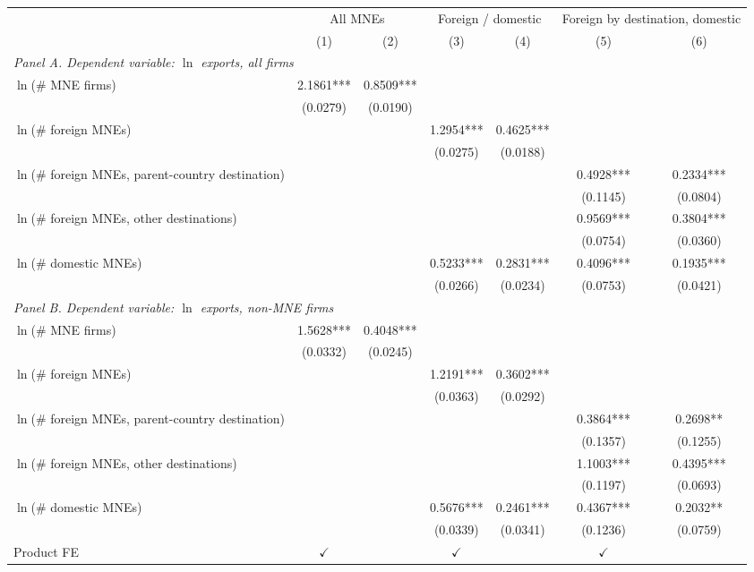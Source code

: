 \begin{tabular}{lcccccc} \hline
 & \multicolumn{2}{c}{All MNEs} & \multicolumn{2}{c}{Foreign / domestic} & \multicolumn{2}{c}{Foreign by destination, domestic} \\
 & (1) & (2) & (3) & (4) & (5) & (6) \\ \hline
\multicolumn{7}{l}{\textit{Panel A. Dependent variable: $\ln$ exports, all firms}} \\
$\ln$(\# MNE firms) & 2.1861*** & 0.8509*** &  &  &  &  \\
 & (0.0279) & (0.0190) &  &  &  &  \\
$\ln$(\# foreign MNEs) &  &  & 1.2954*** & 0.4625*** &  &  \\
 &  &  & (0.0275) & (0.0188) &  &  \\
$\ln$(\# foreign MNEs, parent-country destination) &  &  &  &  & 0.4928*** & 0.2334*** \\
 &  &  &  &  & (0.1145) & (0.0804) \\
$\ln$(\# foreign MNEs, other destinations) &  &  &  &  & 0.9569*** & 0.3804*** \\
 &  &  &  &  & (0.0754) & (0.0360) \\
$\ln$(\# domestic MNEs) &  &  & 0.5233*** & 0.2831*** & 0.4096*** & 0.1935*** \\
 &  &  & (0.0266) & (0.0234) & (0.0753) & (0.0421) \\
\midrule
\multicolumn{7}{l}{\textit{Panel B. Dependent variable: $\ln$ exports, non-MNE firms}} \\
$\ln$(\# MNE firms) & 1.5628*** & 0.4048*** &  &  &  &  \\
 & (0.0332) & (0.0245) &  &  &  &  \\
$\ln$(\# foreign MNEs) &  &  & 1.2191*** & 0.3602*** &  &  \\
 &  &  & (0.0363) & (0.0292) &  &  \\
$\ln$(\# foreign MNEs, parent-country destination) &  &  &  &  & 0.3864*** & 0.2698** \\
 &  &  &  &  & (0.1357) & (0.1255) \\
$\ln$(\# foreign MNEs, other destinations) &  &  &  &  & 1.1003*** & 0.4395*** \\
 &  &  &  &  & (0.1197) & (0.0693) \\
$\ln$(\# domestic MNEs) &  &  & 0.5676*** & 0.2461*** & 0.4367*** & 0.2032** \\
 &  &  & (0.0339) & (0.0341) & (0.1236) & (0.0759) \\
\hline
Product FE & $\checkmark$ &  & $\checkmark$ &  & $\checkmark$ &  \\

\end{tabular}
